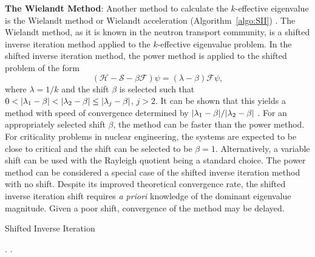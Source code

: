 \textbf{The Wielandt Method}: Another method to calculate the $k$-effective eigenvalue is the Wielandt method or Wielandt acceleration (Algorithm~\ref{algo:SII}) \cite{yamamoto_reliable_2004}. The Wielandt method, as it is known in the neutron transport community, is a shifted inverse iteration method \cite{ipsen_computing_1997} applied to the $k$-effective eigenvalue problem. In the shifted inverse iteration method, the power method is applied to the shifted problem of the form
\begin{equation}
(\mathcal{H} - \mathcal{S} - \beta \mathcal{F})\psi = (\lambda - \beta) \mathcal{F} \psi,
\end{equation}
where $\lambda = 1/k$ and the shift $\beta$ is selected such that $0 < \lvert\lambda_{1} - \beta\rvert < \lvert\lambda_{2} - \beta\rvert \leq \lvert\lambda_{j} - \beta\rvert$, $j > 2$. It can be shown that this yields a method with speed of convergence determined by $\lvert\lambda_{1} - \beta\rvert/\lvert\lambda_{2} - \beta\rvert$ \cite{ipsen_computing_1997}. For an appropriately selected shift $\beta$, the method can be faster than the power method. For criticality problems in nuclear engineering, the systems are expected to be close to critical and the shift can be selected to be $\beta = 1$. Alternatively, a variable shift can be used with the Rayleigh quotient being a standard choice. The power method can be considered a special case of the shifted inverse iteration method with no shift. Despite its improved theoretical convergence rate, the shifted inverse iteration shift requires \textit{a priori} knowledge of the dominant eigenvalue magnitude. Given a poor shift, convergence of the method may be delayed.

\begin{algorithm}[H]
				\caption{Shifted Inverse Iteration \cite{ipsen_computing_1997}}
				\begin{algorithmic}[1]
						.
						.
					\ENDFOR
				\end{algorithmic}
				\label{algo:SII}
\end{algorithm}





